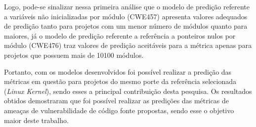 Logo, pode-se sinalizar nessa primeira análise que o modelo de predição
referente a variáveis não inicializadas por módulo (CWE457) apresenta valores
adequados de predição tanto para projetos com um menor número de módulos quanto
para maiores, já o modelo de predição referente a referência a ponteiros nulos
por módulo (CWE476) traz valores de predição aceitáveis para a métrica apenas
para projetos que possuem mais de 10100 módulos. 

Portanto, com os modelos desenvolvidos foi possível realizar a predição das
métricas em questão para projetos do mesmo porte da referência selecionada
(\textit{Linux Kernel}), sendo esses a principal contribuição desta pesquisa. Os
resultados obtidos demostraram que foi possível realizar
as predições das métricas de ameaças de vulnerabilidade de código fonte
propostas, sendo esse o objetivo maior deste trabalho.

